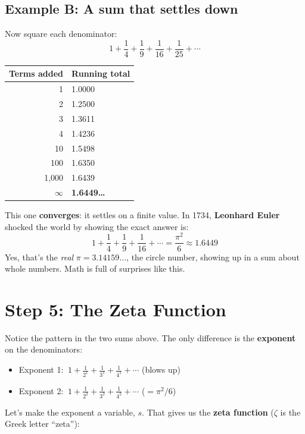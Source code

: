 \documentclass[11pt,a4paper]{article}
\begin{document}
\subsection*{Example B: A sum that settles down}

Now square each denominator:
\[
1 + \frac14 + \frac19 + \frac1{16} + \frac1{25} + \cdots
\]

\begin{center}
\begin{tabular}{r l}
\toprule
Terms added & Running total \\
\midrule
1 & 1.0000 \\
2 & 1.2500 \\
3 & 1.3611 \\
4 & 1.4236 \\
10 & 1.5498 \\
100 & 1.6350 \\
1{,}000 & 1.6439 \\
$\infty$ & \textbf{1.6449\ldots} \\
\bottomrule
\end{tabular}
\end{center}

This one \textbf{converges}: it settles on a finite value. In 1734, \textbf{Leonhard Euler} shocked the world by showing the exact answer is:
\[
1 + \frac14 + \frac19 + \frac1{16} + \cdots = \frac{\pi^2}{6} \approx 1.6449
\]
Yes, that's the \emph{real} $\pi = 3.14159\ldots$, the circle number, showing up in a sum about whole numbers. Math is full of surprises like this.

\section{Step 5: The Zeta Function}

Notice the pattern in the two sums above. The only difference is the \textbf{exponent} on the denominators:
\begin{itemize}[itemsep=1pt]
  \item Exponent 1: $\ 1 + \frac1{2^1} + \frac1{3^1} + \frac1{4^1} + \cdots$ \quad (blows up)
  \item Exponent 2: $\ 1 + \frac1{2^2} + \frac1{3^2} + \frac1{4^2} + \cdots$ \quad ($=\pi^2/6$)
\end{itemize}

Let's make the exponent a variable, $s$. That gives us the \textbf{zeta function} ($\zeta$ is the Greek letter ``zeta''):
\end{document}

